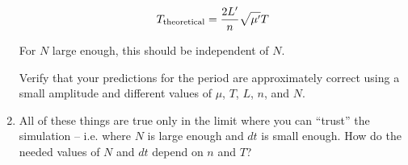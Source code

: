 \documentclass[12pt]{article}
\begin{document}
\begin{enumerate}
$$
T_{\rm theoretical} = \frac{2L'}{n} \sqrt{\mu'}{T}
$$

For $N$ large enough, this should be independent of $N$. 

Verify that your predictions for the period are approximately correct using a small amplitude and different values of $\mu$, $T$, $L$, $n$, and $N$. 

\item All of these things are true only in the limit where you can ``trust'' the simulation -- i.e. where $N$ is large enough and $dt$ is small enough. How do the needed
values of $N$ and $dt$ depend on $n$ and $T$?


 


\end{enumerate}
\end{document}
